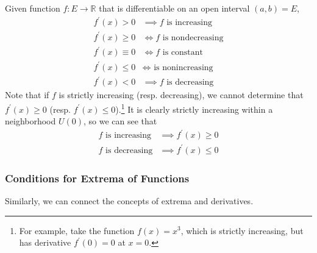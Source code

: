   \begin{theorem}
  Given function $f: E \longrightarrow \mathbb{R}$ that is differentiable on an open interval $(a, b) = E$, 
  \begin{align*}
      f^\prime (x) > 0 & \implies f \text{ is increasing} \\
      f^\prime (x) \geq 0 & \iff f \text{ is nondecreasing} \\
      f^\prime (x) \equiv 0 & \iff f \text{ is constant} \\
      f^\prime (x) \leq 0 & \iff \text{ is nonincreasing} \\
      f^\prime (x) < 0 & \implies f \text{ is decreasing} 
  \end{align*}
  Note that if $f$ is strictly increasing (resp. decreasing), we cannot determine that $f^\prime(x) \geq 0$ (resp. $f^\prime (x) \leq 0$).\footnote{For example, take the function $f(x) = x^3$, which is strictly increasing, but has derivative $f^\prime (0) = 0$ at $x = 0$.} It is clearly strictly increasing within a neighborhood $U(0)$, so we can see that
  \begin{align*}
      f \text{ is increasing} & \implies f^\prime (x) \geq 0 \\
      f \text{ is decreasing} & \implies f^\prime (x) \leq 0
  \end{align*}
  \end{theorem}


  \subsubsection{Conditions for Extrema of Functions}
  Similarly, we can connect the concepts of extrema and derivatives. 

